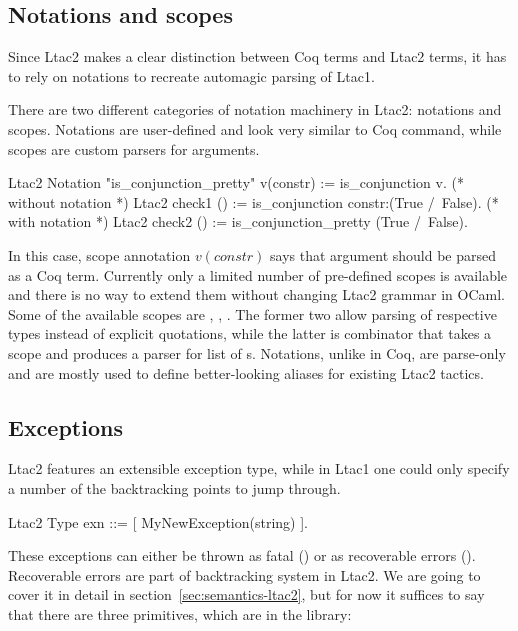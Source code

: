 \subsection{Notations and scopes}
\label{subsec:ltac2-notations-scopes}

Since Ltac2 makes a clear distinction between Coq terms and Ltac2 terms, it has to rely on notations to recreate automagic parsing of Ltac1.

There are two different categories of notation machinery in Ltac2: notations and scopes.
Notations are user-defined and look very similar to Coq  command, while scopes are custom parsers for arguments.
\begin{coq}
Ltac2 Notation "is_conjunction_pretty" v(constr) := is_conjunction v.
(* without notation *)
Ltac2 check1 () := is_conjunction constr:(True /\ False).
(* with notation *)
Ltac2 check2 () := is_conjunction_pretty (True /\ False).
\end{coq}

In this case, scope annotation \(v(constr)\) says that argument  should be parsed as a Coq term.
Currently only a limited number of pre-defined scopes is available and there is no way to extend them without changing Ltac2 grammar in OCaml.
Some of the available scopes are , , .
The former two allow parsing of respective types instead of explicit quotations, while the latter is combinator that takes a scope  and produces a parser for list of s.
Notations, unlike in Coq, are parse-only and are mostly used to define better-looking aliases for existing Ltac2 tactics.

\subsection{Exceptions}
\label{subsec:ltac2-exceptions}

Ltac2 features an extensible exception type, while in Ltac1 one could only specify a number of the backtracking points to jump through.
\begin{coq}
Ltac2 Type exn ::= [ MyNewException(string) ].
\end{coq}

These exceptions can either be thrown as fatal () or as recoverable errors ().
Recoverable errors are part of backtracking system in Ltac2.
We are going to cover it in detail in section~\ref{sec:semantics-ltac2}, but for now it suffices to say that there are three primitives, which are in the  library:

